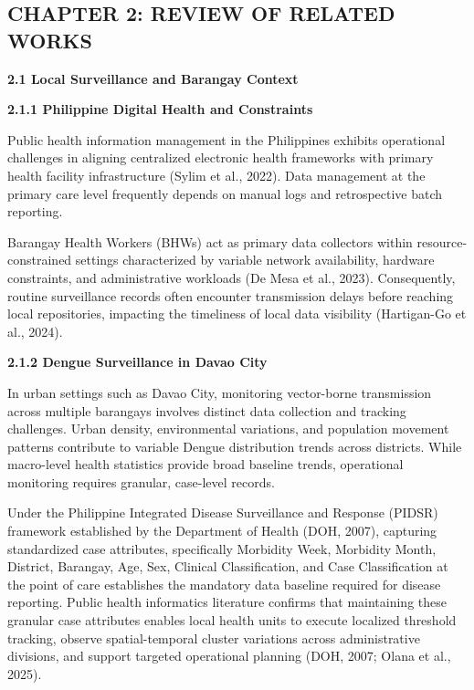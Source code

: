 \documentclass[
]{article}
\begin{document}
\subsection{\texorpdfstring{\textbf{CHAPTER 2: REVIEW OF RELATED
WORKS}}{CHAPTER 2: REVIEW OF RELATED WORKS}}\label{chapter-2-review-of-related-works}

\textbf{2.1 Local Surveillance and Barangay Context}

\textbf{2.1.1 Philippine Digital Health and Constraints}

Public health information management in the Philippines exhibits
operational challenges in aligning centralized electronic health
frameworks with primary health facility infrastructure (Sylim et al.,
2022). Data management at the primary care level frequently depends on
manual logs and retrospective batch reporting.

Barangay Health Workers (BHWs) act as primary data collectors within
resource-constrained settings characterized by variable network
availability, hardware constraints, and administrative workloads (De
Mesa et al., 2023). Consequently, routine surveillance records often
encounter transmission delays before reaching local repositories,
impacting the timeliness of local data visibility (Hartigan-Go et al.,
2024).

\textbf{2.1.2 Dengue Surveillance in Davao City}

In urban settings such as Davao City, monitoring vector-borne
transmission across multiple barangays involves distinct data collection
and tracking challenges. Urban density, environmental variations, and
population movement patterns contribute to variable Dengue distribution
trends across districts. While macro-level health statistics provide
broad baseline trends, operational monitoring requires granular,
case-level records.

Under the Philippine Integrated Disease Surveillance and Response
(PIDSR) framework established by the Department of Health (DOH, 2007),
capturing standardized case attributes, specifically Morbidity Week,
Morbidity Month, District, Barangay, Age, Sex, Clinical Classification,
and Case Classification at the point of care establishes the mandatory
data baseline required for disease reporting. Public health informatics
literature confirms that maintaining these granular case attributes
enables local health units to execute localized threshold tracking,
observe spatial-temporal cluster variations across administrative
divisions, and support targeted operational planning (DOH, 2007; Olana
et al., 2025).
\end{document}
